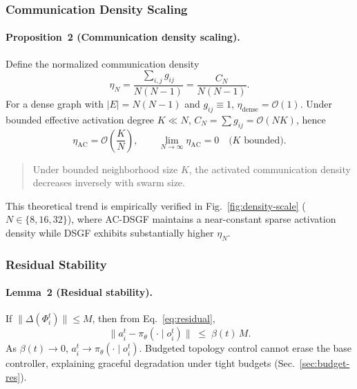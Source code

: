 \subsubsection{Communication Density Scaling}
\label{sec:theory-density}

\paragraph{Proposition~2 (Communication density scaling).}
\label{prop:density}
Define the normalized communication density
\begin{equation}
\eta_N
=
\frac{\sum_{i,j}g_{ij}}{N(N-1)}
=
\frac{C_N}{N(N-1)}.
\label{eq:eta}
\end{equation}
For a dense graph with $|E|=N(N-1)$ and $g_{ij}\equiv 1$,
$\eta_{\mathrm{dense}}=\mathcal{O}(1)$.
Under bounded effective activation degree $K\ll N$,
$C_N=\sum g_{ij}=\mathcal{O}(NK)$, hence
\begin{equation}
\eta_{\mathrm{AC}}
=
\mathcal{O}\!\left(\frac{K}{N}\right),
\qquad
\lim_{N\to\infty}\eta_{\mathrm{AC}}=0
\quad\text{($K$ bounded)}.
\label{eq:eta-limit}
\end{equation}
\begin{quote}
Under bounded neighborhood size $K$, the activated communication density
decreases inversely with swarm size.
\end{quote}
This theoretical trend is empirically verified in Fig.~\ref{fig:density-scale}
($N\in\{8,16,32\}$), where AC-DSGF maintains a near-constant sparse
activation density while DSGF exhibits substantially higher $\eta_N$.

\subsubsection{Residual Stability}
\label{sec:theory-residual}

\paragraph{Lemma~2 (Residual stability).}
If $\|\Delta(\Phi_i^{t})\|\le M$, then from Eq.~\eqref{eq:residual},
\begin{equation}
\bigl\|a_i^{t}-\pi_{\theta}(\cdot\mid o_i^{t})\bigr\|
\;\le\;
\beta(t)\,M.
\label{eq:residual-bound}
\end{equation}
As $\beta(t)\!\to\!0$, $a_i^{t}\!\to\!\pi_{\theta}(\cdot\mid o_i^{t})$.
Budgeted topology control cannot erase the base controller, explaining
graceful degradation under tight budgets (Sec.~\ref{sec:budget-res}).

